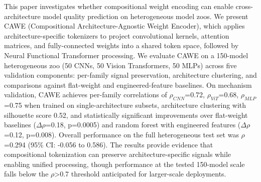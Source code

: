 
This paper investigates whether compositional weight encoding can enable cross-architecture model quality prediction on heterogeneous model zoos. We present CAWE (Compositional Architecture-Agnostic Weight Encoder), which applies architecture-specific tokenizers to project convolutional kernels, attention matrices, and fully-connected weights into a shared token space, followed by Neural Functional Transformer processing. We evaluate CAWE on a 150-model heterogeneous zoo (50 CNNs, 50 Vision Transformers, 50 MLPs) across five validation components: per-family signal preservation, architecture clustering, and comparisons against flat-weight and engineered-feature baselines. On mechanism validation, CAWE achieves per-family correlations of $\rho_{CNN}$=0.72, $\rho_{ViT}$=0.68, $\rho_{MLP}$=0.75 when trained on single-architecture subsets, architecture clustering with silhouette score 0.52, and statistically significant improvements over flat-weight baselines ($\Delta\rho$=0.18, p=0.0005) and random forest with engineered features ($\Delta\rho$=0.12, p=0.008). Overall performance on the full heterogeneous test set was $\rho$=0.294 (95\% CI: -0.056 to 0.586). The results provide evidence that compositional tokenization can preserve architecture-specific signals while enabling unified processing, though performance at the tested 150-model scale falls below the $\rho$>0.7 threshold anticipated for larger-scale deployments.
